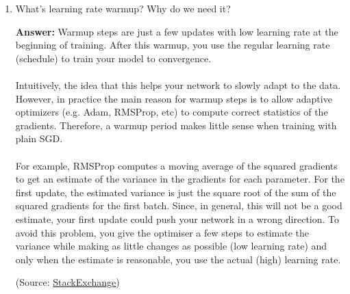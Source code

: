 \documentclass{article}
\newenvironment{QandA}{\begin{enumerate}[label=\arabic*.]}{\end{enumerate}}
\newenvironment{InnerQandA}{\begin{enumerate}[label=\roman*.]}{\end{enumerate}}
\newenvironment{answer}{\par\normalfont \textbf{Answer:}}{}
\begin{document}
\begin{QandA}
\begin{InnerQandA}
        \item What’s learning rate warmup? Why do we need it?
        \begin{answer}
            Warmup steps are just a few updates with low learning rate at the beginning of training. After this warmup, you use the regular learning rate (schedule) to train your model to convergence.\\\\
            Intuitively, the idea that this helps your network to slowly adapt to the data. However, in practice the main reason for warmup steps is to allow adaptive optimizers (e.g. Adam, RMSProp, etc) to compute correct statistics of the gradients. Therefore, a warmup period makes little sense when training with plain SGD. \\\\
            For example, RMSProp computes a moving average of the squared gradients to get an estimate of the variance in the gradients for each parameter. For the first update, the estimated variance is just the square root of the sum of the squared gradients for the first batch. Since, in general, this will not be a good estimate, your first update could push your network in a wrong direction. To avoid this problem, you give the optimiser a few steps to estimate the variance while making as little changes as possible (low learning rate) and only when the estimate is reasonable, you use the actual (high) learning rate.

            (Source: \href{https://datascience.stackexchange.com/questions/55991/in-the-context-of-deep-learning-what-is-training-warmup-steps}{StackExchange})
        \end{answer}
    \end{InnerQandA}


\end{QandA}
\end{document}
